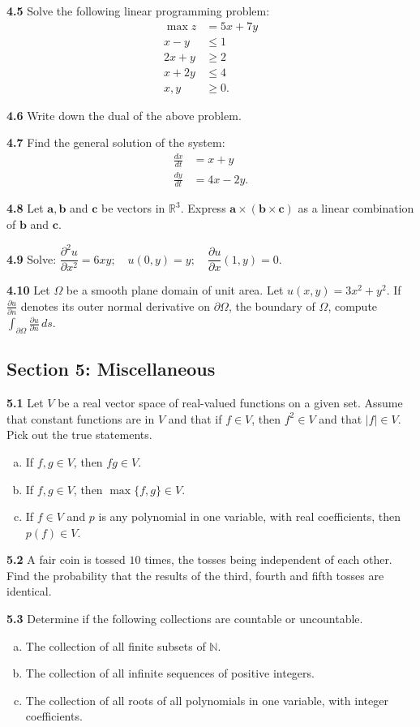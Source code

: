 \documentclass[11pt,a4paper]{article}
\newcommand{\N}{\mathbb{N}}
\newcommand{\R}{\mathbb{R}}
\newcommand{\examsec}[1]{%
  \subsection*{#1}
  \vspace{-2pt}
}
\newcommand{\qitem}[1]{\par\medskip\noindent\textbf{#1}\hspace{0.5em}}
\begin{document}
\qitem{4.5} Solve the following linear programming problem:
\begin{align*}
  \max z &= 5x + 7y \\
  x - y &\le 1 \\
  2x + y &\ge 2 \\
  x + 2y &\le 4 \\
  x, y &\ge 0.
\end{align*}

\qitem{4.6} Write down the dual of the above problem.

\qitem{4.7} Find the general solution of the system:
\begin{align*}
  \frac{dx}{dt} &= x + y \\
  \frac{dy}{dt} &= 4x - 2y.
\end{align*}

\qitem{4.8} Let $\mathbf{a}, \mathbf{b}$ and $\mathbf{c}$ be vectors in $\R^3$. Express $\mathbf{a} \times (\mathbf{b} \times \mathbf{c})$ as a linear combination of $\mathbf{b}$ and $\mathbf{c}$.

\qitem{4.9} Solve: $\dfrac{\partial^2 u}{\partial x^2} = 6xy;\quad u(0, y) = y;\quad \dfrac{\partial u}{\partial x}(1, y) = 0$.

\qitem{4.10} Let $\Omega$ be a smooth plane domain of unit area. Let $u(x, y) = 3x^2 + y^2$. If $\frac{\partial u}{\partial n}$ denotes its outer normal derivative on $\partial\Omega$, the boundary of $\Omega$, compute $\int_{\partial\Omega} \frac{\partial u}{\partial n}\,ds$.

\examsec{Section 5: Miscellaneous}

\qitem{5.1} Let $V$ be a real vector space of real-valued functions on a given set. Assume that constant functions are in $V$ and that if $f \in V$, then $f^2 \in V$ and that $|f| \in V$. Pick out the true statements.
\begin{enumerate}[a.]
  \item If $f, g \in V$, then $fg \in V$.
  \item If $f, g \in V$, then $\max\{f, g\} \in V$.
  \item If $f \in V$ and $p$ is any polynomial in one variable, with real coefficients, then $p(f) \in V$.
\end{enumerate}

\qitem{5.2} A fair coin is tossed $10$ times, the tosses being independent of each other. Find the probability that the results of the third, fourth and fifth tosses are identical.

\qitem{5.3} Determine if the following collections are countable or uncountable.
\begin{enumerate}[a.]
  \item The collection of all finite subsets of $\N$.
  \item The collection of all infinite sequences of positive integers.
  \item The collection of all roots of all polynomials in one variable, with integer coefficients.
\end{enumerate}
\end{document}

